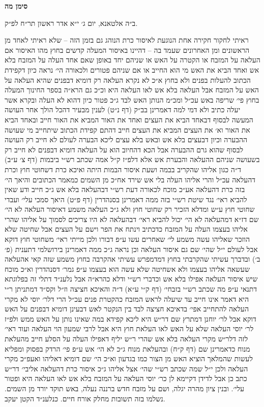 \documentclass[12pt, openany]{book}
\newcommand{\chapname}{}
\newcommand{\newchap}[1]{
	\addcontentsline{toc}{chapter}{#1}
	\renewcommand{\chapname}{#1}
		\begin{center}
			\textbf{%
\fontsize{16pt}{16pt}\selectfont
				#1}
		\end{center}
}
\begin{document}
\newchap{סימן מה}
\begin{multicols}{2}
ב״ה אלטאנא, יום ג׳ י״א אדר ראשון תר״ח לפ״ק.\\\vspace{0pt}

ראיתי לחקור חקירה אחת הנוגעת לאיסור כרת הנוהג גם בזמן הזה – שלא ראיתי לאחד מן הראשונים ומן האחרונים שעמד בה – דהיינו באיסור המעלה קדשים בחוץ מהו האיסור אם העלאה על המזבח או הקטרה על האש או שניהם יחד באופן שאם אחד העלה על המזבח בלא אש ואחד הביא את האש מי הוא החייב או אם שניהם פטורים ולכאורה הי׳ נראה כיון דקפידת הכתוב להעלות בפנים ולא בחוץ א״כ לא נקרא העלאה רק דומיא דבפנים שהיא העלאה על האש על המזבח אבל העלאה בלא אש לאו העלאה היא וכ״כ גם הרא״ה בספר החינוך המעלה בחוץ פי׳ שריפה באש עכ״ל ומכ״מ הנותן האש לבד ג״כ פטור כיון דהוא לא העלה ובקרא אשר יעלה כתיב ולא דמי למה דאמרינן בב״ק (דף נ״ט) לענין מבעיר דהכל הולך אחר העושה המעשה לבסוף דבאחד הביא את העצים ואחד את האור המביא את האור חייב ובאחד הביא את האור וא׳ את העצים המביא את העצים חייב דהתם קפידת הכתוב שיתחייב מי שעושה ההבערה וכיון דבעצים בלא אש ובאש בלא עצים ליכא הבערה לעולם לא חייב רק העושה לבסוף שהוא גרם ההבערה אבל הכא דהחיוב הוא על העלאה דומיא דבפנים לא חייב רק בשעושה שניהם ההעלאה והבערת אש אלא דלפ״ז ק״ל אמה שכתב רש״י ביבמות (דף צ׳ ע״ב) ד״ה כגון אליהו שהקריב בבמה ושעת איסור הבמות היתה ואיכא כרת דשחוטי חוץ וכרת דהעלאה עכ״ל והרי אליהו העלה בלי אש שירד אח״כ מן השמים כמאמר הכתובים והיאך הי׳ בזה כרת דהעלאה אע״כ מוכח לכאורה דעת רש״י דבהעלאה בלא אש ג״כ חייב ודע שאין להביא ראי׳ נגד שיטת רש״י בזה ממה דאמרינן בסנהדרין (דף פ״ט) היאך סמכי עלי׳ ועבדי שחוטי חוץ ע״ש ומדלא הזכיר רק שחוטי חוץ ולא ג״כ העלאה משמע דאיסור העלאה לא הי׳ שם דז״א דמהעלאה לא הי׳ יכול להביא ראי׳ דבהעלאה לא היו צריכים לסמוך על אליהו שהרי אליהו בעצמו העלה על המזבח כדכתיב וינתח את הפר וישם על העצים אבל שחיטה שלא הוזכר שאליהו עשה משמע לי׳ שאחרים עשו ע״פ דבורו ולכן מייתי ראי׳ משחוטי חוץ דוקא אבל לעולם י״ל שהי׳ שם גם איסור העלאה וכן נראה ג״כ ממה דאמרינן בירושלמי דתענית (פ׳ ב׳) ובדברך עשיתי שהקרבתי בחוץ דמדמפרש עשיתי אהקרבה בחוץ משמע שזה קאי אהעלאה שעשאה אליהו בעצמו ולא אשחיטה שלא עשה הוא בעצמו ע״פ גמר׳ דסנהדרין וא״כ מוכח שיש איסור העלאה אפילו בלא אש וכדברי רש״י ודלא כהרא״ה אבל נלענ״ד דתלי זה בפלוגתא דתנאי ע״פ מה שכתב רש״י בזבחי׳ (דף ק״י ע״א) ד״ה והאיכא חציצה וז״ל וקס״ד דמתניתן ר״י היא דאמר אינו חייב עד שיעלה לראש המזבח כהקטרת פנים עכ״ל הרי דלר׳ יוסי לא מקרי העלאה להתחייב אפי׳ בדאיכא חציצה לבד בין הנקטר לאש דבעינן דומיא דבפנים על האש דוקא אבל לר׳ יוחנן דמתרץ שם דר״ש היא ליכא קפידא במה שאינו נותן על האש ממש ולפ״ז לר׳ יוסי העלאה שלא על האש לאו העלאת חוץ היא אבל לרבי שמעון הוי העלאה ועוד ראי׳ לזה דלר״ש מקרי העלאה בלא אש שהרי ר״ש יליף דאפילו העלה על הסלע חייב מהעלאת מנוח כדאמרינן שם (דף ק״ח) ובהעלאת מנוח ג״כ לא הי׳ אש ע״פ פי׳ הרדק בפסוק ומפליא לעשות שהמלאך הוציא האש מן הצור כמו בגדעון וא״כ הי׳ שם דומיא דאליהו ואעפ״כ מקרי העלאה ולכן י״ל שמה שכתב רש״י שהי׳ אצל אליהו ג״כ איסור כרת דהעלאה אליבי׳ דר״ש כתב כן אבל לדידן דקיימא לן כר׳ יוסי העלאה על המזבח בלא אש לאו העלאה היא ופטור עלי׳. ובנין ציון מהרה יגלה, ושם על מזבח חדש ברננה נעלה, באש תוקד יורד מן השמים. נשלמו בזה תשובות מחלק אורח חיים. כנלענ״ד הקטן יעקב.\\\vspace{0pt}

\end{multicols}\newpage
\end{document}
